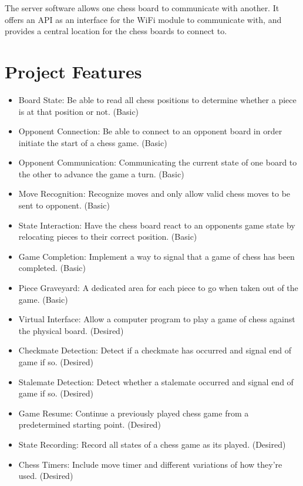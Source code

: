 \documentclass{article}
\begin{document}
The server software allows one chess board to communicate with another. It offers an API as an interface for the WiFi module to communicate with, and provides a central location for the chess boards to connect to.


\section*{Project Features}

\begin{itemize}


	\item Board State: Be able to read all chess positions to determine whether a piece is at that position or not. (Basic)
	\item Opponent Connection: Be able to connect to an opponent board in order initiate the start of a chess game. (Basic)
	\item Opponent Communication: Communicating the current state of one board to the other to advance the game a turn. (Basic)
	\item Move Recognition: Recognize moves and only allow valid chess moves to be sent to opponent. (Basic)
	\item State Interaction: Have the chess board react to an opponents game state by relocating pieces to their correct position. (Basic)
	\item Game Completion: Implement a way to signal that a game of chess has been completed. (Basic)
	\item Piece Graveyard: A dedicated area for each piece to go when taken out of the game. (Basic)


	\item Virtual Interface: Allow a computer program to play a game of chess against the physical board. (Desired)
	\item Checkmate Detection: Detect if a checkmate has occurred and signal end of game if so. (Desired)
	\item Stalemate Detection: Detect whether a stalemate occurred and signal end of game if so. (Desired)
	\item Game Resume: Continue a previously played chess game from a predetermined starting point. (Desired)
	\item State Recording: Record all states of a chess game as its played. (Desired)
	\item Chess Timers: Include move timer and different variations of how they're used. (Desired)


\end{itemize}
\end{document}
